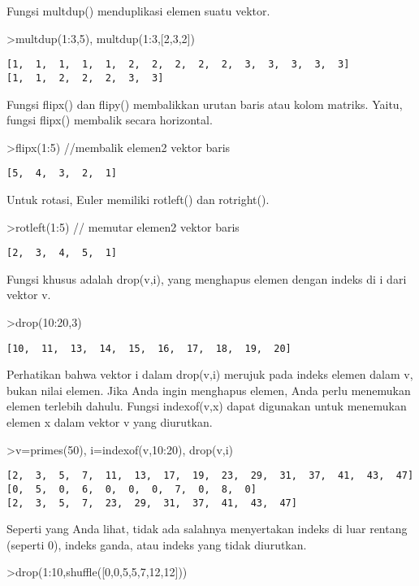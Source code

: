 \documentclass[
]{book}
\begin{document}
Fungsi multdup() menduplikasi elemen suatu vektor.

\textgreater multdup(1:3,5), multdup(1:3,{[}2,3,2{]})

\begin{verbatim}
[1,  1,  1,  1,  1,  2,  2,  2,  2,  2,  3,  3,  3,  3,  3]
[1,  1,  2,  2,  2,  3,  3]
\end{verbatim}

Fungsi flipx() dan flipy() membalikkan urutan baris atau kolom matriks. Yaitu, fungsi flipx() membalik secara horizontal.

\textgreater flipx(1:5) //membalik elemen2 vektor baris

\begin{verbatim}
[5,  4,  3,  2,  1]
\end{verbatim}

Untuk rotasi, Euler memiliki rotleft() dan rotright().

\textgreater rotleft(1:5) // memutar elemen2 vektor baris

\begin{verbatim}
[2,  3,  4,  5,  1]
\end{verbatim}

Fungsi khusus adalah drop(v,i), yang menghapus elemen dengan indeks di i dari vektor v.

\textgreater drop(10:20,3)

\begin{verbatim}
[10,  11,  13,  14,  15,  16,  17,  18,  19,  20]
\end{verbatim}

Perhatikan bahwa vektor i dalam drop(v,i) merujuk pada indeks elemen dalam v, bukan nilai elemen. Jika Anda ingin menghapus elemen, Anda perlu menemukan elemen terlebih dahulu. Fungsi indexof(v,x) dapat digunakan untuk menemukan elemen x dalam vektor v yang diurutkan.

\textgreater v=primes(50), i=indexof(v,10:20), drop(v,i)

\begin{verbatim}
[2,  3,  5,  7,  11,  13,  17,  19,  23,  29,  31,  37,  41,  43,  47]
[0,  5,  0,  6,  0,  0,  0,  7,  0,  8,  0]
[2,  3,  5,  7,  23,  29,  31,  37,  41,  43,  47]
\end{verbatim}

Seperti yang Anda lihat, tidak ada salahnya menyertakan indeks di luar rentang (seperti 0), indeks ganda, atau indeks yang tidak diurutkan.

\textgreater drop(1:10,shuffle({[}0,0,5,5,7,12,12{]}))
\end{document}

